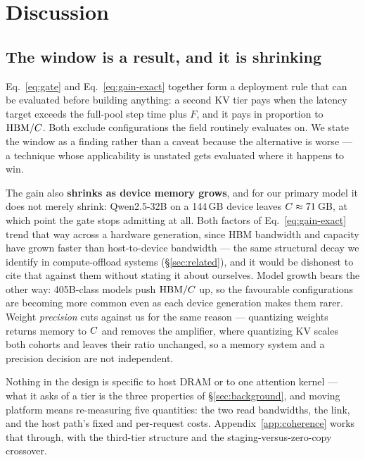 %
\section{Discussion}
\label{sec:discussion}

\subsection{The window is a result, and it is shrinking}

Eq.~\ref{eq:gate} and Eq.~\ref{eq:gain-exact} together form a deployment rule that
can be evaluated before building anything: a second KV tier pays when the latency
target exceeds the full-pool step time plus $F$, and it pays in proportion to
$\mathrm{HBM}/C$. Both exclude configurations the field routinely evaluates on. We state
the window as a finding rather than a caveat because the alternative is worse --- a
technique whose applicability is unstated gets evaluated where it happens to win.

The gain also \textbf{shrinks as device memory grows}, and for our primary model it
does not merely shrink: Qwen2.5-32B on a 144\,GB device leaves $C \approx
71$\,GB, at which point the gate stops admitting at all. Both factors of
Eq.~\ref{eq:gain-exact} trend that way across a hardware generation, since HBM
bandwidth and capacity have grown faster than host-to-device bandwidth --- the same
structural decay we identify in compute-offload systems (\S\ref{sec:related}), and
it would be dishonest to cite that against them without stating it about ourselves.
Model growth bears the other way: 405B-class models push $\mathrm{HBM}/C$ up, so the
favourable configurations are becoming more common even as each device generation
makes them rarer. Weight \emph{precision} cuts against us for the same reason ---
quantizing weights returns memory to $C$ and removes the amplifier, where
quantizing KV scales both cohorts and leaves their ratio unchanged, so a memory
system and a precision decision are not independent.

Nothing in the design is specific to host DRAM or to one attention kernel --- what
it asks of a tier is the three properties of \S\ref{sec:background}, and moving
platform means re-measuring five quantities: the two read bandwidths, the link, and
the host path's fixed and per-request costs. Appendix~\ref{app:coherence} works
that through, with the third-tier structure and the staging-versus-zero-copy
crossover.

